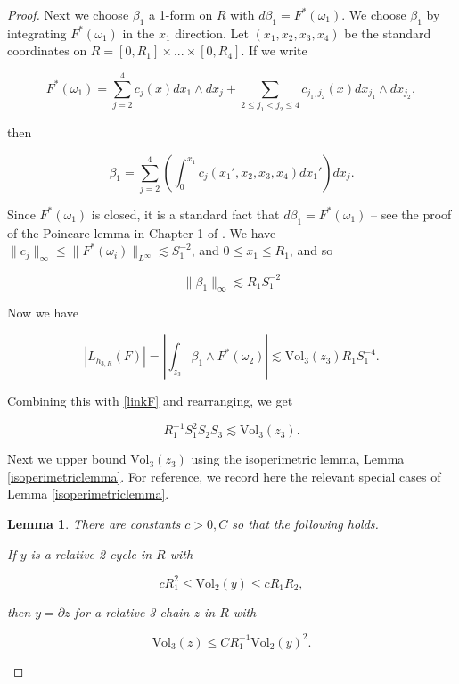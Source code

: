 \documentclass{amsart}
\newtheorem*{theorem 1}{Theorem 1}
\newtheorem*{theorem 2}{Theorem 2}
\newtheorem*{theorem 3}{Theorem 3}
\newtheorem{lemma}{Lemma}[section]
\numberwithin{equation}{section}
\newcommand{\Vol}{\textrm{Vol}}
\begin{document}
\begin{proof}
Next we choose $\beta_1$ a 1-form on $R$ with $d \beta_1 = F^*(\omega_1)$.    We choose $\beta_1$ by integrating $F^*(\omega_1)$ in the $x_1$ direction.   Let $(x_1, x_2, x_3, x_4)$ be the standard coordinates on $R = [0,R_1] \times ... \times [0, R_4]$.   If we write 

$$F^*(\omega_1) = \sum_{j =2}^4 c_j(x) dx_1 \wedge dx_j + \sum_{2 \le j_1 < j_2 \le 4} c_{j_1, j_2}(x) d x_{j_1} \wedge d x_{j_2}, $$

then

$$ \beta_1 = \sum_{j=2}^4 \left( \int_{0}^{x_1} c_j(x_1',  x_2,  x_3, x_4) dx_1' \right) dx_j. $$

Since $F^*(\omega_1)$ is closed,  it is a standard fact that $d \beta_1 = F^*(\omega_1)$ -- see the proof of the Poincare lemma in Chapter 1 of \cite{BT}.    We have $\| c_j \|_\infty \le \|F^*(\omega_i) \|_{L^\infty} \lesssim S_1^{-2}$,  and $0 \le x_1 \le R_1$,  and so

\begin{equation} \label{betabound}
\| \beta_1 \|_{\infty} \lesssim R_1 S_1^{-2}
\end{equation}

Now we have

$$ |L_{h_{3,R}}(F)| = \left| \int_{z_3} \beta_1 \wedge F^*(\omega_2) \right| \lesssim \Vol_3(z_3) R_1 S_1^{-4}.  $$

Combining this with \eqref{linkF} and rearranging, we get

\begin{equation} \label{stepSz}  R_1^{-1} S_1^2 S_2 S_3 \lesssim \Vol_3(z_3).  \end{equation}

Next we upper bound $\Vol_3(z_3)$ using the isoperimetric lemma,  Lemma \ref{isoperimetriclemma}.   For reference,  we record here the relevant special cases of Lemma \ref{isoperimetriclemma}.   

\begin{lemma} \label{lemmaisoperimetric2} There are constants $c > 0, C$ so that the
following holds.

If $y$ is a relative 2-cycle in $R$ with 

\begin{equation} \label{casea} c R_1^2 \le \Vol_2(y) \le c R_1 R_2,  \end{equation}

then $y = \partial z$ for a relative 3-chain $z$ in $R$ with

\begin{equation} \label{bounda}  \Vol_3(z) \le C R_1^{-1} \Vol_2(y)^2.  \end{equation}


\end{lemma}
\end{proof}
\end{document}
